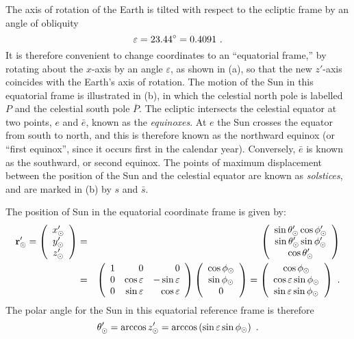 The axis of rotation of the Earth is tilted with respect to the ecliptic frame by an angle of obliquity
\begin{equation}
\varepsilon = 23.44^\circ = 0.4091 ~.
\la{eq:obliquity}
\end{equation}
It is therefore convenient to change coordinates to an ``equatorial frame,'' by rotating about the $x$-axis by an angle $\varepsilon$, as shown in (a), so that the new $z'$-axis coincides with the Earth's axis of rotation.  The motion of the Sun in this equatorial frame is illustrated in (b), in which the celestial north pole is labelled $P$ and the celestial south pole $\overline P$.  The ecliptic intersects the celestial equator at two points, $e$ and $\bar e$, known as the {\it equinoxes}.  At $e$ the Sun crosses the equator from south to north, and this is therefore known as the northward equinox (or ``first equinox'', since it occurs first in the calendar year).  Conversely, $\bar e$ is known as the southward, or second equinox.  The points of maximum displacement between the position of the Sun and the celestial equator are known as {\it solstices}, and are marked in (b) by $s$ and $\bar s$.

The position of Sun in the equatorial coordinate frame is given by:
\begin{eqnarray}
\VV r'_\odot =
\left( \begin{array}{c} x'_\odot \\ y'_\odot \\ z'_\odot \end{array} \right) &=&
\left( \begin{array}{c} \sin \theta'_\odot \cos \phi'_\odot \\ \sin \theta'_\odot \sin \phi'_\odot \\ \cos \theta'_\odot \end{array} \right) \nn
&=&
\left( \begin{array}{r r r}
1 & 0 & 0 \\
0 & \cos \varepsilon & - \sin \varepsilon \\
0 & \sin \varepsilon & \cos \varepsilon
\end{array} \right)
\left( \begin{array}{c} \cos \phi_\odot  \\ \sin \phi_\odot \\ 0 \end{array} \right) = 
\left( \begin{array}{c} \cos \phi_\odot  \\ \cos \varepsilon \sin \phi_\odot \\ \sin \varepsilon \sin \phi_\odot \end{array} \right) ~.
\la{eq:equatorial}
\end{eqnarray}
The polar angle for the Sun in this equatorial reference frame is therefore
\begin{equation}
\theta'_\odot = \arccos z'_\odot = \arccos \left( \sin \varepsilon \sin \phi_\odot \right)~.
\la{eq:polar-sun}
\end{equation}

